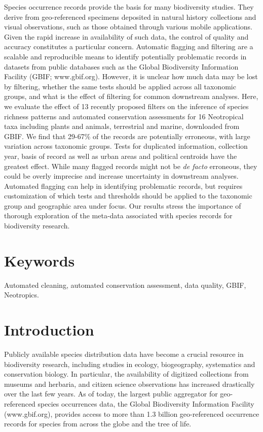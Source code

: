 \documentclass[
  12pt,
]{article}
\begin{document}
Species occurrence records provide the basis for many biodiversity studies. They derive from geo-referenced specimens deposited in natural history collections and visual observations, such as those obtained through various mobile applications. Given the rapid increase in availability of such data, the control of quality and accuracy constitutes a particular concern. Automatic flagging and filtering are a scalable and reproducible means to identify potentially problematic records in datasets from public databases such as the Global Biodiversity Information Facility (GBIF; www.gbif.org). However, it is unclear how much data may be lost by filtering, whether the same tests should be applied across all taxonomic groups, and what is the effect of filtering for common downstream analyses. Here, we evaluate the effect of 13 recently proposed filters on the inference of species richness patterns and automated conservation assessments for 16 Neotropical taxa including plants and animals, terrestrial and marine, downloaded from GBIF. We find that 29-67\% of the records are potentially erroneous, with large variation across taxonomic groups. Tests for duplicated information, collection year, basis of record as well as urban areas and political centroids have the greatest effect. While many flagged records might not be \emph{de facto} erroneous, they could be overly imprecise and increase uncertainty in downstream analyses. Automated flagging can help in identifying problematic records, but requires customization of which tests and thresholds should be applied to the taxonomic group and geographic area under focus. Our results stress the importance of thorough exploration of the meta-data associated with species records for biodiversity research.

\hypertarget{keywords}{%
\section{Keywords}\label{keywords}}

Automated cleaning, automated conservation assessment, data quality, GBIF, Neotropics.

\newpage{}

\hypertarget{introduction}{%
\section{Introduction}\label{introduction}}

Publicly available species distribution data have become a crucial resource in biodiversity research, including studies in ecology, biogeography, systematics and conservation biology. In particular, the availability of digitized collections from museums and herbaria, and citizen science observations has increased drastically over the last few years. As of today, the largest public aggregator for geo-referenced species occurrences data, the Global Biodiversity Information Facility (www.gbif.org), provides access to more than 1.3 billion geo-referenced occurrence records for species from across the globe and the tree of life.
\end{document}
